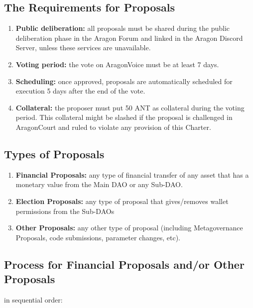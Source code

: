 \subsection{The Requirements for Proposals}
\begin{enumerate}
	\item \textbf{Public deliberation:} all proposals must be shared during the public deliberation phase in the Aragon Forum and linked in the Aragon Discord Server, unless these services are unavailable.
	\item \textbf{Voting period:} the vote on \gls{AragonVoice} must be at least 7 days.
	\item \textbf{Scheduling:} once approved, proposals are automatically scheduled for execution 5 days after the end of the vote.
	\item \textbf{Collateral:} the proposer must put 50 \ac{ANT} as collateral during the voting period.
	This collateral might be slashed if the proposal is challenged in \gls{AragonCourt} and ruled to violate any provision of this Charter.
\end{enumerate}

\subsection{Types of Proposals}
\begin{enumerate}		
	\item \textbf{Financial Proposals:} any type of financial transfer of any asset that has a monetary value from the Main \ac{DAO} or any Sub-\ac{DAO}.
	\item \textbf{Election Proposals:} any type of proposal that gives/removes wallet permissions from the Sub-\acp{DAO}
	\item \textbf{Other Proposals:} any other type of proposal (including Metagovernance Proposals, code submissions, parameter changes, etc).
\end{enumerate}

\subsection{Process for Financial Proposals and/or Other Proposals} 
 in sequential order:


